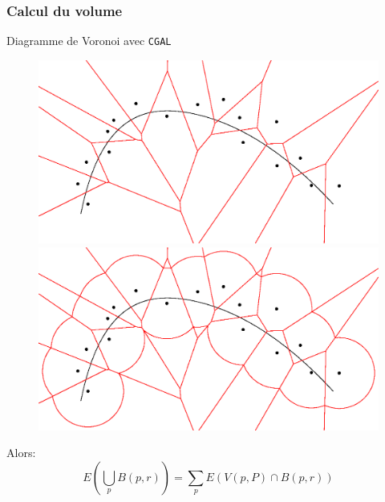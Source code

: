 \documentclass{beamer}
\begin{document}
\begin{frame}
    \frametitle{Calcul du volume}

    Diagramme de Voronoi avec \texttt{CGAL}
    \begin{figure}
        \centering
        \includegraphics[scale=0.28]{img/voronoi-curve-2d}
        \hfill
        \includegraphics[scale=0.28]{img/voronoi-offset-2d}
    \end{figure}

    Alors:
    $$ E \left( \bigcup_p B(p, r) \right) = \sum_p E(V(p, P) \cap B(p, r)) $$
\end{frame}
\end{document}
